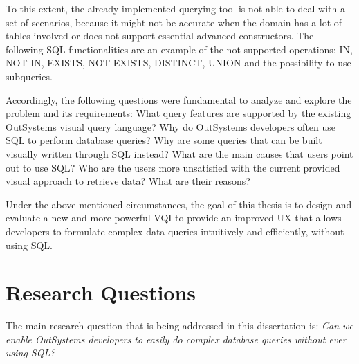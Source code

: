To this extent, the already implemented querying tool is not able to deal with a set of scenarios, because it might not be accurate when the domain has a lot of tables involved or does not support essential advanced constructors. The following \gls{SQL} functionalities are an example of the not supported operations: IN, NOT IN, EXISTS, NOT EXISTS, DISTINCT, UNION and the possibility to use subqueries.

Accordingly, the following questions were fundamental to analyze and explore the problem and its requirements: What query features are supported by the existing OutSystems visual query language? Why do OutSystems developers often use \gls{SQL} to perform database queries? Why are some queries that can be built visually written through \gls{SQL} instead? What are the main causes that users point out to use \gls{SQL}? Who are the users more unsatisfied with the current provided visual approach to retrieve data? What are their reasons?


Under the above mentioned circumstances, the goal of this thesis is to design and evaluate a new and more powerful \gls{VQI} to provide an improved \gls{UX} that allows developers to formulate complex data queries intuitively and efficiently, without using \gls{SQL}.

\section{Research Questions}
\label{sec:research_questions}
The main research question that is being addressed in this dissertation is: \textit{Can we enable OutSystems developers to easily do complex database queries without ever using \gls{SQL}?}


